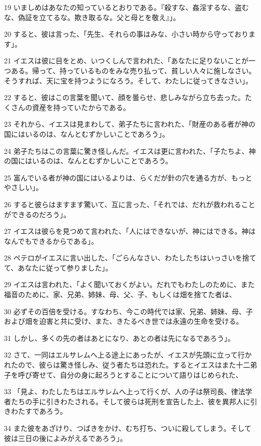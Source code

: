 \par 19 いましめはあなたの知っているとおりである。『殺すな、姦淫するな、盗むな、偽証を立てるな。欺き取るな。父と母とを敬え』」。
\par 20 すると、彼は言った、「先生、それらの事はみな、小さい時から守っております」。
\par 21 イエスは彼に目をとめ、いつくしんで言われた、「あなたに足りないことが一つある。帰って、持っているものをみな売り払って、貧しい人々に施しなさい。そうすれば、天に宝を持つようになろう。そして、わたしに従ってきなさい」。
\par 22 すると、彼はこの言葉を聞いて、顔を曇らせ、悲しみながら立ち去った。たくさんの資産を持っていたからである。
\par 23 それから、イエスは見まわして、弟子たちに言われた、「財産のある者が神の国にはいるのは、なんとむずかしいことであろう」。
\par 24 弟子たちはこの言葉に驚き怪しんだ。イエスは更に言われた、「子たちよ、神の国にはいるのは、なんとむずかしいことであろう。
\par 25 富んでいる者が神の国にはいるよりは、らくだが針の穴を通る方が、もっとやさしい」。
\par 26 すると彼らはますます驚いて、互に言った、「それでは、だれが救われることができるのだろう」。
\par 27 イエスは彼らを見つめて言われた、「人にはできないが、神にはできる。神はなんでもできるからである」。
\par 28 ペテロがイエスに言い出した、「ごらんなさい、わたしたちはいっさいを捨てて、あなたに従って参りました」。
\par 29 イエスは言われた、「よく聞いておくがよい。だれでもわたしのために、また福音のために、家、兄弟、姉妹、母、父、子、もしくは畑を捨てた者は、
\par 30 必ずその百倍を受ける。すなわち、今この時代では家、兄弟、姉妹、母、子および畑を迫害と共に受け、また、きたるべき世では永遠の生命を受ける。
\par 31 しかし、多くの先の者はあとになり、あとの者は先になるであろう」。
\par 32 さて、一同はエルサレムへ上る途上にあったが、イエスが先頭に立って行かれたので、彼らは驚き怪しみ、従う者たちは恐れた。するとイエスはまた十二弟子を呼び寄せて、自分の身に起ろうとすることについて語りはじめられた、
\par 33 「見よ、わたしたちはエルサレムへ上って行くが、人の子は祭司長、律法学者たちの手に引きわたされる。そして彼らは死刑を宣告した上、彼を異邦人に引きわたすであろう。
\par 34 また彼をあざけり、つばきをかけ、むち打ち、ついに殺してしまう。そして彼は三日の後によみがえるであろう」。
